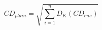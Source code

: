 \begin{equation}
    CD_{plain} = \sqrt{\sum_{i=1}^{n} D_K(CD_{enc})}
    \label{eq:fhe_cd_decrypt}
\end{equation}